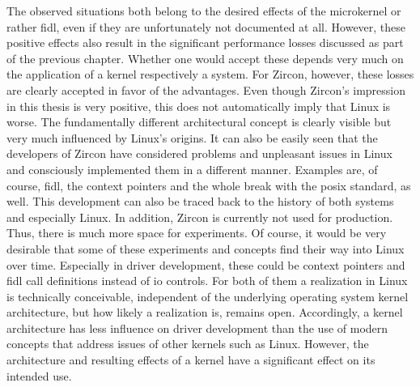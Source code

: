The observed situations both belong to the desired effects of the microkernel or rather \ac{fidl}, even if they are unfortunately not documented at all.
However, these positive effects also result in the significant performance losses discussed as part of the previous chapter.
Whether one would accept these depends very much on the application of a kernel respectively a system.
For Zircon, however, these losses are clearly accepted in favor of the advantages.
Even though Zircon's impression in this thesis is very positive, this does not automatically imply that Linux is worse.
The fundamentally different architectural concept is clearly visible but very much influenced by Linux's origins.
It can also be easily seen that the developers of Zircon have considered problems and unpleasant issues in Linux and consciously implemented them in a different manner.
Examples are, of course, \ac{fidl}, the context pointers and the whole break with the \ac{posix} standard, as well.
This development can also be traced back to the history of both systems and especially Linux.
In addition, Zircon is currently not used for production.
Thus, there is much more space for experiments.
Of course, it would be very desirable that some of these experiments and concepts find their way into Linux over time.
Especially in driver development, these could be context pointers and \ac{fidl} call definitions instead of \ac{io} controls.
For both of them a realization in Linux is technically conceivable, independent of the underlying operating system kernel architecture, but how likely a realization is, remains open.
Accordingly, a kernel architecture has less influence on driver development than the use of modern concepts that address issues of other kernels such as Linux.
However, the architecture and resulting effects of a kernel have a significant effect on its intended use.





